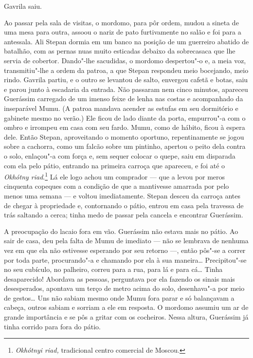 Gavrila saiu.

Ao passar pela sala de visitas, o mordomo, para pôr ordem, mudou a
sineta de uma mesa para outra, assoou o nariz de pato furtivamente no
salão e foi para a antessala. Ali Stepan dormia em um banco na posição
de um guerreiro abatido de batalhão, com as pernas nuas muito esticadas
debaixo da sobrecasaca que lhe servia de cobertor. Dando"-lhe sacudidas,
o mordomo despertou"-o e, a meia voz, transmitiu"-lhe a ordem da patroa, a
que Stepan respondeu meio bocejando, meio rindo. Gavrila partiu, e o
outro se levantou de salto, envergou cafetã e botas, saiu e parou junto
à escadaria da entrada. Não passaram nem cinco minutos, apareceu
Guerássim carregado de um imenso feixe de lenha nas costas e acompanhado
da inseparável Mumu. (A patroa mandava acender as estufas em seu
dormitório e gabinete mesmo no verão.) Ele ficou de lado diante da
porta, empurrou"-a com o ombro e irrompeu em casa com seu fardo. Mumu,
como de hábito, ficou à espera dele. Então Stepan, aproveitando o
momento oportuno, repentinamente se jogou sobre a cachorra, como um
falcão sobre um pintinho, apertou o peito dela contra o solo, enlaçou"-a
com força e, sem sequer colocar o quepe, saiu em disparada com ela pelo
pátio, entrando na primeira carroça que apareceu, e foi até o
\emph{Okhótny riad}.\footnote{\emph{Okhótnyi riad,} tradicional
  centro comercial de Moscou.} Lá ele logo achou um comprador --- que a
levou por meros cinquenta copeques com a condição de que a mantivesse
amarrada por pelo menos uma semana --- e voltou imediatamente. Stepan
desceu da carroça antes de chegar à propriedade e, contornando o pátio,
entrou em casa pela travessa de trás saltando a cerca; tinha medo de
passar pela cancela e encontrar Guerássim.

A preocupação do lacaio fora em vão. Guerássim não estava mais no pátio.
Ao sair de casa, deu pela falta de Mumu de imediato --- não se lembrava
de nenhuma vez em que ela não estivesse esperando por seu retorno ---,
então pôs"-se a correr por toda parte, procurando"-a e chamando por ela à
sua maneira\ldots{} Precipitou"-se no seu cubículo, no palheiro, correu para a
rua, para lá e para cá\ldots{} Tinha desaparecido! Abordava as pessoas,
perguntava por ela fazendo os sinais mais desesperados, apontava um
terço de metro acima do solo, desenhava"-a por meio de gestos\ldots{} Uns não
sabiam mesmo onde Mumu fora parar e só balançavam a cabeça, outros
sabiam e sorriam a ele em resposta. O mordomo assumiu um ar de grande
importância e se pôs a gritar com os cocheiros. Nessa altura, Guerássim
já tinha corrido para fora do pátio.

